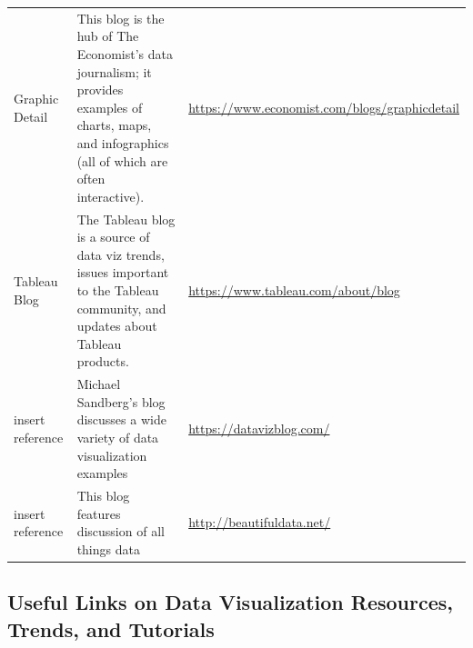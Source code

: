 \documentclass[]{book}
\begin{document}
\begin{longtable}[]{@{}lll@{}}
\begin{minipage}[t]{0.11\columnwidth}
Graphic Detail\strut
\end{minipage} & \begin{minipage}[t]{0.20\columnwidth}\raggedright\strut
This blog is the hub of The Economist's data journalism; it provides
examples of charts, maps, and infographics (all of which are often
interactive).\strut
\end{minipage} & \begin{minipage}[t]{0.11\columnwidth}\raggedright\strut
\url{https://www.economist.com/blogs/graphicdetail}\strut
\end{minipage}\tabularnewline
\begin{minipage}[t]{0.11\columnwidth}\raggedright\strut
Tableau Blog\strut
\end{minipage} & \begin{minipage}[t]{0.20\columnwidth}\raggedright\strut
The Tableau blog is a source of data viz trends, issues important to the
Tableau community, and updates about Tableau products.\strut
\end{minipage} & \begin{minipage}[t]{0.11\columnwidth}\raggedright\strut
\url{https://www.tableau.com/about/blog}\strut
\end{minipage}\tabularnewline
\begin{minipage}[t]{0.11\columnwidth}\raggedright\strut
insert reference\strut
\end{minipage} & \begin{minipage}[t]{0.20\columnwidth}\raggedright\strut
Michael Sandberg's blog discusses a wide variety of data visualization
examples\strut
\end{minipage} & \begin{minipage}[t]{0.11\columnwidth}\raggedright\strut
\url{https://datavizblog.com/}\strut
\end{minipage}\tabularnewline
\begin{minipage}[t]{0.11\columnwidth}\raggedright\strut
insert reference\strut
\end{minipage} & \begin{minipage}[t]{0.20\columnwidth}\raggedright\strut
This blog features discussion of all things data\strut
\end{minipage} & \begin{minipage}[t]{0.11\columnwidth}\raggedright\strut
\url{http://beautifuldata.net/}\strut
\end{minipage}\tabularnewline
\bottomrule
\end{longtable}

\subsection{Useful Links on Data Visualization Resources, Trends, and
Tutorials}\label{useful-links-on-data-visualization-resources-trends-and-tutorials}
\end{document}
